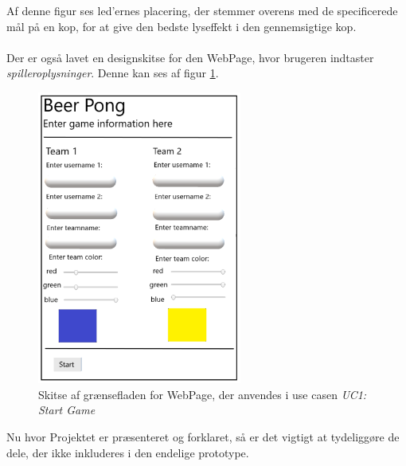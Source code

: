 \documentclass[Rapport/Rapport_main.tex]{subfiles}
\begin{document}
Af denne figur ses led'ernes placering, der stemmer overens med de specificerede mål på en kop, for at give den bedste lyseffekt i den gennemsigtige kop.\\\\
Der er også lavet en designskitse for den WebPage, hvor brugeren indtaster \textit{spilleroplysninger}. Denne kan ses af figur \ref{fig:rap_webpage_sketch}.

\begin{figure}[H]
    \centering
    \includegraphics[width=0.6\textwidth]{Kravspecifikation/Ikke-funktionelle/graphics/WebPage_IF.png}
    \caption{Skitse af grænsefladen for WebPage, der anvendes i use casen \textit{UC1: Start Game}}
   \label{fig:rap_webpage_sketch}
\end{figure}
Nu hvor Projektet er præsenteret og forklaret, så er det vigtigt at tydeliggøre de dele, der ikke inkluderes i den endelige prototype.
\end{document}
